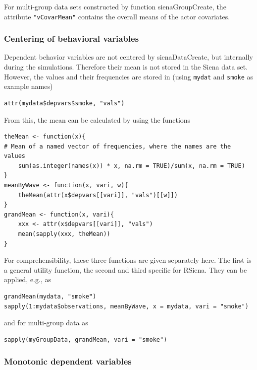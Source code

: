 \documentclass[a4paper,fleqn,11pt]{article}
\newcommand{\+}{\, + \,}
\newcommand{\sfn}[1]{\textsf{#1}}
\newcommand{\rs}{{\sf RSiena}}
\begin{document}
For multi-group data sets constructed by function \sfn{sienaGroupCreate},
the attribute \texttt{"vCovarMean"} contains the overall means
of the actor covariates.


\subsubsection{Centering of behavioral variables}

Dependent behavior variables are not centered by \textsf{sienaDataCreate},
but internally during the simulations.
Therefore their mean is not stored in the Siena data set.
However, the values and their frequencies are stored in
(using \texttt{mydat} and \texttt{smoke} as example names)
\begin{verbatim}
attr(mydata$depvars$smoke, "vals")
\end{verbatim}
From this, the mean can be calculated by using the functions
\begin{verbatim}
theMean <- function(x){
# Mean of a named vector of frequencies, where the names are the values
    sum(as.integer(names(x)) * x, na.rm = TRUE)/sum(x, na.rm = TRUE)
}
meanByWave <- function(x, vari, w){
    theMean(attr(x$depvars[[vari]], "vals")[[w]])
}
grandMean <- function(x, vari){
    xxx <- attr(x$depvars[[vari]], "vals")
    mean(sapply(xxx, theMean))
}
\end{verbatim}
For comprehensibility, these three functions are given separately here.
The first is a general utility function, the second and third specific for \rs.
They can be applied, e.g., as
\begin{verbatim}
grandMean(mydata, "smoke")
sapply(1:mydata$observations, meanByWave, x = mydata, vari = "smoke")
\end{verbatim}
and for multi-group data as
\begin{verbatim}
sapply(myGroupData, grandMean, vari = "smoke")
\end{verbatim}





\subsubsection{Monotonic dependent variables}
\label{S_monotone}
\end{document}
